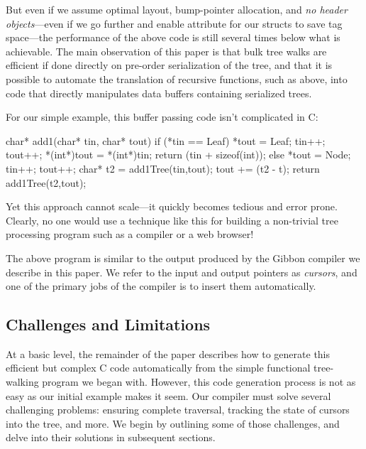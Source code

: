 \documentclass[a4paper,english]{lipics-v2016}
\newcommand{\treelang}{Gibbon\xspace} %
\begin{document}
But even if we assume optimal layout, bump-pointer allocation, and {\em no
  header objects}---even if we go further and enable  attribute
for our structs to save tag space---the performance of the above code is still
several times below what is achievable.  The main observation of this paper is
that bulk tree walks are efficient if done directly on pre-order serialization
of the tree, and that it is possible to automate the translation of recursive
functions, such as  above, into code that directly manipulates data
buffers containing serialized trees.

For our simple example, this buffer passing code isn't complicated in C:
%
\begin{code}[language=c]
char* add1(char* tin, char* tout) {
  if (*tin == Leaf) {
    *tout = Leaf;
    tin++; tout++;
    *(int*)tout = *(int*)tin;
    return (tin + sizeof(int));
  } else {
    *tout = Node;
    tin++; tout++;
    char* t2 = add1Tree(tin,tout);
    tout += (t2 - t);
    return add1Tree(t2,tout);
  }
}
\end{code}
%
Yet this approach cannot scale---it quickly becomes tedious and error prone.
Clearly, no one would use a technique like this for building a
non-trivial tree processing program such as a compiler or a web browser!

The above program is similar to the output produced by the \treelang compiler we
describe in this paper.  We refer to the input and output pointers as {\em
  cursors}, and one of the primary jobs of the compiler is to insert
them automatically.



\subsection{Challenges and Limitations}
\label{sec:limitations}

At a basic level, the remainder of the paper describes how to generate
this efficient but complex C code automatically from the simple
functional tree-walking program we began with.
%
However, this code generation process is not as easy as our initial
example makes it seem. Our compiler must solve several challenging
problems: ensuring complete traversal, tracking the state of cursors
into the tree, and more. We begin by outlining some of those
challenges, and delve into their solutions in subsequent sections.
\end{document}
